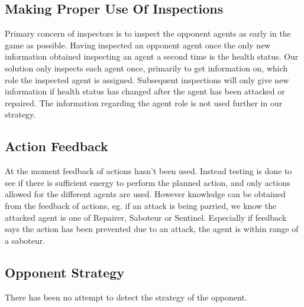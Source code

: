 \documentclass[11pt]{article}
\begin{document}
\subsection{Making Proper Use Of Inspections}
Primary concern of inspectors is to inspect the opponent agents as early in the game as possible. Having inspected an opponent agent once the only new information obtained inspecting an agent a second time is the health status. Our solution only inspects each agent once, primarily to get information on, which role the inspected agent is assigned. Subsequent inspections will only give new information if health status has changed after the agent has been attacked or repaired. The information regarding the agent role is not used further in our strategy.

\subsection{Action Feedback}
At the moment feedback of actions hasn't been used. Instead testing is done to see if there is sufficient energy to perform the planned action, and only actions allowed for the different agents are used. However knowledge can be obtained from the feedback of actions, eg. if an attack is being parried, we know the attacked agent is one of Repairer, Saboteur or Sentinel. Especially if feedback says the action has been prevented due to an attack, the agent is within range of a saboteur.

\subsection{Opponent Strategy}
There has been no attempt to detect the strategy of the opponent.
\end{document}
